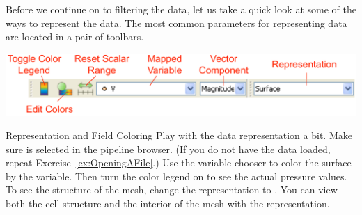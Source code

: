 Before we continue on to filtering the data, let us take a quick look at
some of the ways to represent the data.  The most common parameters for
representing data are located in a pair of toolbars.

\begin{inlinefig}
  \includegraphics[width=\linewidth]{images/DataRepresentationToolbars}
\end{inlinefig}

\begin{exercise}{Representation and Field Coloring}
  \label{ex:RepresentationAndFieldColoring}
  Play with the data representation a bit.  Make sure
   is selected in the pipeline browser.  (If you do
  not have the data loaded, repeat Exercise~\ref{ex:OpeningAFile}.)  Use
  the variable chooser to color the surface by the  variable.
  Then turn the color legend on to see the actual pressure values.  To see
  the structure of the mesh, change the representation to .  You can view both the cell structure and the interior of the
  mesh with the  representation.


\end{exercise}
